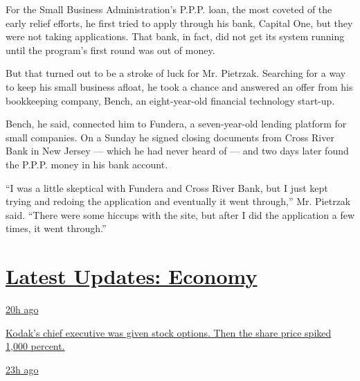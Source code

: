 For the Small Business Administration's P.P.P. loan, the most coveted of
the early relief efforts, he first tried to apply through his bank,
Capital One, but they were not taking applications. That bank, in fact,
did not get its system running until the program's first round was out
of money.

But that turned out to be a stroke of luck for Mr. Pietrzak. Searching
for a way to keep his small business afloat, he took a chance and
answered an offer from his bookkeeping company, Bench, an eight-year-old
financial technology start-up.

Bench, he said, connected him to Fundera, a seven-year-old lending
platform for small companies. On a Sunday he signed closing documents
from Cross River Bank in New Jersey --- which he had never heard of ---
and two days later found the P.P.P. money in his bank account.

``I was a little skeptical with Fundera and Cross River Bank, but I just
kept trying and redoing the application and eventually it went
through,'' Mr. Pietrzak said. ``There were some hiccups with the site,
but after I did the application a few times, it went through.''

\hypertarget{latest-updates-economy}{%
\section{\texorpdfstring{\href{https://www.nytimes3xbfgragh.onion/live/2020/07/31/business/stock-market-today-coronavirus?action=click\&pgtype=Article\&state=default\&region=MAIN_CONTENT_1\&context=storylines_live_updates}{Latest
Updates:
Economy}}{Latest Updates: Economy}}\label{latest-updates-economy}}

\href{https://www.nytimes3xbfgragh.onion/live/2020/07/31/business/stock-market-today-coronavirus?action=click\&pgtype=Article\&state=default\&region=MAIN_CONTENT_1\&context=storylines_live_updates\#kodaks-chief-executive-was-given-stock-options-then-the-share-price-spiked-1000-percent}{20h
ago}

\href{https://www.nytimes3xbfgragh.onion/live/2020/07/31/business/stock-market-today-coronavirus?action=click\&pgtype=Article\&state=default\&region=MAIN_CONTENT_1\&context=storylines_live_updates\#kodaks-chief-executive-was-given-stock-options-then-the-share-price-spiked-1000-percent}{Kodak's
chief executive was given stock options. Then the share price spiked
1,000 percent.}

\href{https://www.nytimes3xbfgragh.onion/live/2020/07/31/business/stock-market-today-coronavirus?action=click\&pgtype=Article\&state=default\&region=MAIN_CONTENT_1\&context=storylines_live_updates\#fitch-ratings-downgrades-its-outlook-on-us-debt}{23h
ago}

